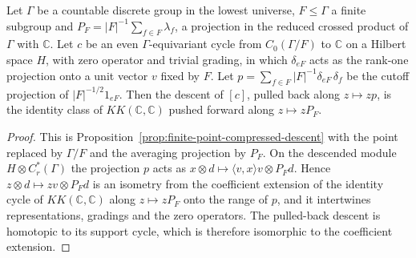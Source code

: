 \begin{proposition}\label{prop:coset-compressed-descent}
\leanok
Let $\Gamma$ be a countable discrete group in the lowest universe, $F\le\Gamma$ a
finite subgroup and $P_F=|F|^{-1}\sum_{f\in F}\lambda_f$, a projection in the reduced
crossed product of $\Gamma$ with $\mathbb C$. Let $c$ be an even
$\Gamma$-equivariant cycle from $C_0(\Gamma/F)$ to $\mathbb C$ on a Hilbert space $H$,
with zero operator and trivial grading, in which $\delta_{eF}$ acts as the rank-one
projection onto a unit vector $v$ fixed by $F$. Let $p=\sum_{f\in F}|F|^{-1}\delta_{eF}\,
\delta_f$ be the cutoff projection of $|F|^{-1/2}1_{eF}$. Then the descent of $[c]$,
pulled back along $z\mapsto zp$, is the identity class of $KK(\mathbb C,\mathbb C)$
pushed forward along $z\mapsto zP_F$.
\end{proposition}
\begin{proof}
\leanok
This is Proposition~\ref{prop:finite-point-compressed-descent} with the point
replaced by $\Gamma/F$ and the averaging projection by $P_F$. On the descended module
$H\otimes C^*_r(\Gamma)$ the projection $p$ acts as
$x\otimes d\mapsto\langle v,x\rangle v\otimes P_Fd$. Hence
$z\otimes d\mapsto zv\otimes P_Fd$ is an isometry from the coefficient extension of
the identity cycle of $KK(\mathbb C,\mathbb C)$ along $z\mapsto zP_F$ onto the range
of $p$, and it intertwines representations, gradings and the zero operators. The
pulled-back descent is homotopic to its support cycle, which is therefore
isomorphic to the coefficient extension.
\end{proof}

